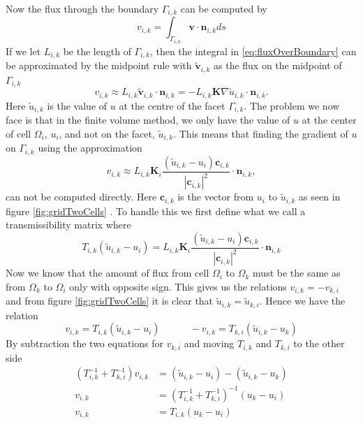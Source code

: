  Now the flux through the boundary $\Gamma_{i,k}$ can be computed by
\begin{equation}
    v_{i,k} = \int_{\Gamma_{i,k}} \textbf{v}\cdot\textbf{n}_{i,k} ds 
    \label{eq:fluxOverBoundary}
\end{equation}
If we let $L_{i,k}$ be the length of $\Gamma_{i,k}$, then the integral in \eqref{eq:fluxOverBoundary} can be approximated by the midpoint rule with $\tilde{\textbf{v}}_{i,k}$ as the flux on the midpoint of $\Gamma_{i,k}$ 
\begin{equation*}
    v_{i,k} \approx L_{i,k}\tilde{\textbf{v}}_{i,k} \cdot \textbf{n}_{i,k} = -L_{i,k}\textbf{K}\nabla \tilde{u}_{i,k} \cdot \textbf{n}_{i,k}.
\end{equation*}
Here $\tilde{u}_{i,k}$ is the value of $u$ at the centre of the facet $\Gamma_{i,k}$. The problem we now face is that in the finite volume method, we only have the value of $u$ at the center of cell $\Omega_i$, $u_i$, and not on the facet, $\tilde{u}_{i,k}$. This means that finding the gradient of $u$ on $\Gamma_{i,k}$ using the approximation
\begin{equation*}
    v_{i,k} \approx L_{i,k}\textbf{K}_i\frac{(\tilde{u}_{i,k} - u_i)\textbf{c}_{i,k}}{|\textbf{c}_{i,k}|^2} \cdot \textbf{n}_{i,k},
\end{equation*}
can not be computed directly. Here $\textbf{c}_{i,k}$ is the vector from $u_i$ to $\tilde{u}_{i,k}$ as seen in figure \ref{fig:gridTwoCells} . To handle this we first define what we call a transmissibility matrix where
\begin{equation}
    T_{i,k}(\tilde{u}_{i,k} - u_i) = L_{i,k}\textbf{K}_i\frac{(\tilde{u}_{i,k} - u_i)\textbf{c}_{i,k}}{|\textbf{c}_{i,k}|^2} \cdot \textbf{n}_{i,k}
    \label{eq:transmissibility}
\end{equation}
Now we know that the amount of flux from cell $\Omega_i$ to $\Omega_k$ must be the same as from $\Omega_k$ to $\Omega_i$ only with opposite sign. This gives us the relations $v_{i,k} = -v_{k,i}$ and from figure \ref{fig:gridTwoCells} it is clear that $\tilde{u}_{i,k} = \tilde{u}_{k,i}$. Hence we have the relation 
\begin{equation*}
    v_{i,k} = T_{i,k}(\tilde{u}_{i,k} - u_i) \hspace{3em} -v_{i,k} = T_{k,i}(\tilde{u}_{i,k} - u_k)
\end{equation*}
By subtraction the two equations for $v_{k,i}$ and moving $T_{i,k}$ and $T_{k,i}$ to the other side 
\begin{equation}
    \begin{align*}
        (T_{i,k}^{-1} + T_{k,i}^{-1}) v_{i,k} &= (\tilde{u}_{i,k} - u_i) - (\tilde{u}_{i,k} - u_k)
        \\
        v_{i,k} &= (T_{i,k}^{-1} + T_{k,i}^{-1})^{-1}(u_k - u_i) \\
        v_{i,k} &= T_{i,k}(u_k - u_i)
    \end{align*}
    \label{eq:flux}
\end{equation}
